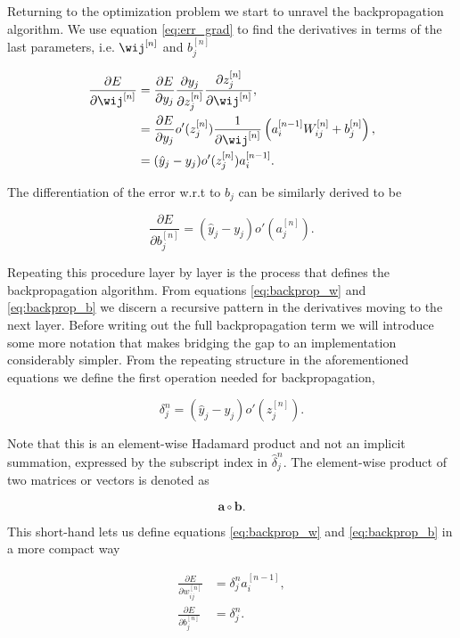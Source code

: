 Returning to the optimization problem we start to unravel the backpropagation algorithm. We use equation \ref{eq:err_grad} to find the derivatives in terms of the last parameters, i.e. $\wij^{[n]}$ and $b_j^{[n]}$

\begin{align}
\frac{\partial E}{\partial \wij^{[n]}} &= 
\frac{\partial E}{\partial y_j} 
\frac{\partial y_j}{\partial z_j^{[n]}}
\frac{\partial z_j^{[n]}}{\partial \wij^{[n]}}, \\
&= \frac{\partial E}{\partial y_j} o'(z^{[n]}_j)
\frac{1}{\partial \wij^{[n]}} \left(a^{[n-1]}_iW^{[n]}_{ij} + b^{[n]}_j\right), \\
&= (\hat{y}_j - y_j)o'(z^{[n]}_j) a^{[n-1]}_i. \label{eq:backprop_w}
\end{align}

\noindent The differentiation of the error w.r.t to $b_j$ can be similarly derived to be 

\begin{equation}\label{eq:backprop_b}
\frac{\partial E}{\partial b_j^{[n]}}= (\hat{y}_j - y_j)o'(a^{[n]}_j).
\end{equation}

\noindent Repeating this procedure layer by layer is the process that defines the backpropagation algorithm. From equations \ref{eq:backprop_w} and \ref{eq:backprop_b} we discern a recursive pattern in the derivatives moving to the next layer. Before writing out the full backpropagation term we will introduce some more notation that makes bridging the gap to an implementation considerably simpler. From the repeating structure in the aforementioned equations we define the first operation needed for backpropagation,

\begin{equation}
\delta^n_j = (\hat{y}_j - y_j)o'(z_j^{[n]}).
\end{equation}

\noindent Note that this is an element-wise Hadamard product and not an implicit summation, expressed by the subscript index in $\hat{\delta}^n_j$.
The element-wise product of two matrices or vectors is denoted as  

\begin{equation}
\mathbf{a} \circ \mathbf{b}.
\end{equation}

\noindent This short-hand lets us define equations \ref{eq:backprop_w} and \ref{eq:backprop_b} in a more compact way

\begin{align}
\frac{\partial E}{\partial w_{ij}^{[n]}} &= \delta^n_j a^{[n-1]}_i,\\
\frac{\partial E}{\partial b_{j}^{[n]}} &= \delta^n_j.
\end{align} 

